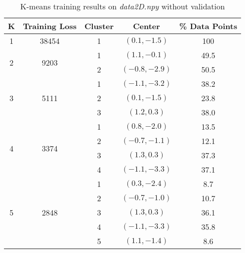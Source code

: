 \documentclass[a4paper,12pt]{article}
\begin{document}
\begin{table}[!htb]
\centering
\caption{K-means training results on \textit{data2D.npy} without validation}
\label{tab:K_means/2D_1_1_3_results}
\vspace{1em}
\begin{tabular}{|c|c|c|c|c|} \hline
K & Training Loss & Cluster & Center & \% Data Points \\ \hline
1 & 38454 & 1 & $(0.1, -1.5)$ & 100 \\ \hline
\multirow{2}{*}{2} & \multirow{2}{*}{9203} 
	& 1 & $(1.1, -0.1)$ & 49.5 \\
    & & 2 & $(-0.8, -2.9)$ & 50.5 \\ \hline
\multirow{3}{*}{3} & \multirow{3}{*}{5111} 
	& 1 & $(-1.1, -3.2)$ & 38.2 \\ 
    & & 2 & $(0.1, -1.5)$ & 23.8 \\ 
    & & 3 & $(1.2, 0.3)$ & 38.0 \\ \hline
\multirow{4}{*}{4} & \multirow{4}{*}{3374} 
	& 1 & $(0.8, -2.0)$ & 13.5 \\ 
    & & 2 & $(-0.7, -1.1)$ & 12.1 \\ 
    & & 3 & $(1.3, 0.3)$ & 37.3 \\
    & & 4 & $(-1.1, -3.3)$ & 37.1 \\ \hline
\multirow{5}{*}{5} & \multirow{5}{*}{2848} 
	& 1 & $(0.3, -2.4)$ & 8.7 \\ 
    & & 2 & $(-0.7, -1.0)$ & 10.7 \\ 
    & & 3 & $(1.3, 0.3)$ & 36.1 \\
    & & 4 & $(-1.1, -3.3)$ & 35.8 \\
    & & 5 & $(1.1, -1.4)$ & 8.6 \\ \hline
\end{tabular}
\end{table}
\end{document}
